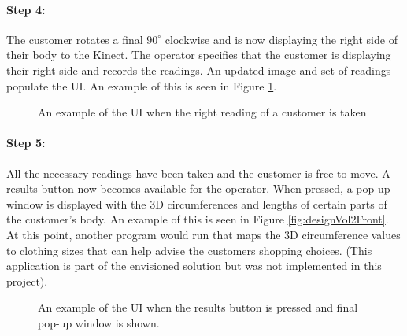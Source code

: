 \paragraph{Step 4: } The customer rotates a final $90^{\circ}$ clockwise and is now displaying the right side of their body to the Kinect. The operator specifies that the customer is displaying their right side and records the readings. An updated image and set of readings populate the UI. An example of this is seen in Figure \ref{fig:designVol2Right}. 

\begin{figure}[ht]
	\centering
	{%
		\setlength{\fboxsep}{0pt}%
		\setlength{\fboxrule}{0.5pt}%
		}
	\caption{An example of the UI when the right reading of a customer is taken}
	\label{fig:designVol2Right}
\end{figure}

\paragraph{Step 5: } All the necessary readings have been taken and the customer is free to move. A results button now becomes available for the operator. When pressed, a pop-up window is displayed with the 3D circumferences and lengths of certain parts of the customer's body. An example of this is seen in Figure \ref{fig:designVol2Front}. At this point, another program would run that maps the 3D circumference values to clothing sizes that can help advise the customers shopping choices. (This application is part of the envisioned solution but was not implemented in this project). 

\begin{figure}[ht]
	\centering
	{%
		\setlength{\fboxsep}{0pt}%
		\setlength{\fboxrule}{0.5pt}%
		}
	\caption{An example of the UI when the results button is pressed and final pop-up window is shown.}
	\label{fig:designVol2Circum}
\end{figure}

